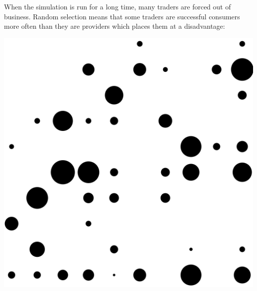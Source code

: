 \documentclass[5p,times]{elsarticle}
\begin{document}
When the simulation is run for a long time, many traders are forced out of business. Random selection means that some traders are successful consumers more often than they are providers which places them at a disadvantage:
\begin{center}
\includegraphics[width=0.75\columnwidth]{end_services}
\end{center}
\end{document}
